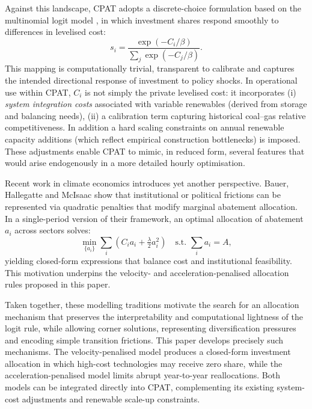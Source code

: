 \documentclass[preprint,authoryear,12pt]{elsarticle}
\begin{document}
Against this landscape, \textsc{CPAT} adopts a discrete-choice formulation based on the
multinomial logit model \citep{CPATdocs}, in which investment shares respond smoothly to
differences in levelised cost:
\begin{equation}
s_i
    = \frac{\exp(-C_i/\beta)}{\sum_j \exp(-C_j/\beta)}.
\label{eq:CPATlogit}
\end{equation}
This mapping is computationally trivial, transparent to calibrate and captures the intended
directional response of investment to policy shocks. In operational use within \textsc{CPAT},
$C_i$ is not simply the private levelised cost: it incorporates (i) \emph{system integration costs}
associated with variable renewables (derived from storage and balancing needs), (ii) a calibration
term capturing historical coal–gas relative competitiveness. In addition a hard scaling constraints on
annual renewable capacity additions (which reflect empirical construction bottlenecks) is imposed. These
adjustments enable \textsc{CPAT} to mimic, in reduced form, several features that would arise
endogenously in a more detailed hourly optimisation.

Recent work in climate economics introduces yet another perspective. Bauer, Hallegatte and
McIsaac \citeyearpar{BauerHallegatteMcIsaac2025} show that institutional or political frictions can
be represented via quadratic penalties that modify marginal abatement allocation. In a
single-period version of their framework, an optimal allocation of abatement $a_i$ across
sectors solves:
\begin{equation}
\min_{\{a_i\}} \sum_i \left( C_i a_i + \tfrac{\lambda}{2} a_i^2 \right)
    \quad \text{s.t. } \sum_i a_i = A,
\label{eq:hallegatte}
\end{equation}
yielding closed-form expressions that balance cost and institutional feasibility. This motivation
underpins the velocity- and acceleration-penalised allocation rules proposed in this paper.

Taken together, these modelling traditions motivate the search for an allocation mechanism that
preserves the interpretability and computational lightness of the logit rule, while allowing
corner solutions, representing diversification pressures and encoding simple transition
frictions. This paper develops precisely such mechanisms. The velocity-penalised model
produces a closed-form investment allocation in which high-cost technologies may receive zero
share, while the acceleration-penalised model limits abrupt year-to-year reallocations. Both
models can be integrated directly into \textsc{CPAT}, complementing its existing system-cost
adjustments and renewable scale-up constraints.
\end{document}
